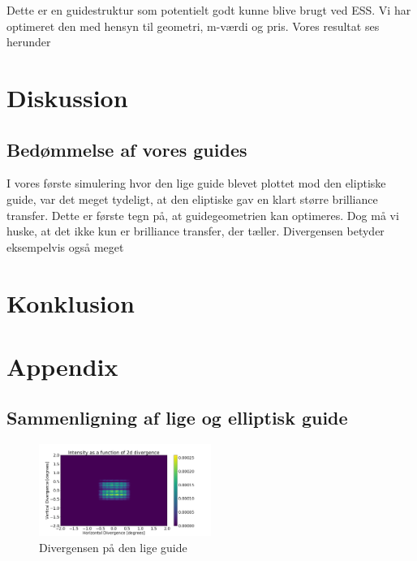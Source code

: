 \documentclass[12pt,oneside,a4paper]{article}
\begin{document}
{{{{{Dette er en guidestruktur som potentielt godt kunne blive brugt ved ESS. Vi har optimeret den med hensyn til geometri, m-værdi og pris. Vores resultat ses herunder

\section{Diskussion}

\subsection{Bedømmelse af vores guides}
I vores første simulering hvor den lige guide blevet plottet mod den eliptiske guide, var det meget tydeligt, at den eliptiske gav en klart større brilliance transfer. Dette er første tegn på, at guidegeometrien kan optimeres. Dog må vi huske, at det ikke kun er brilliance transfer, der tæller. Divergensen betyder eksempelvis også meget

\section{Konklusion}



\newpage

 

\newpage

\appendix
\section{Appendix}

\subsection{Sammenligning af lige og elliptisk guide}

\begin{figure}[H]
\centering
\includegraphics[width=0.5\textwidth]{div_straight_after.png}
\caption{Divergensen på den lige guide}
\end{figure}

}}}}}
\end{document}
